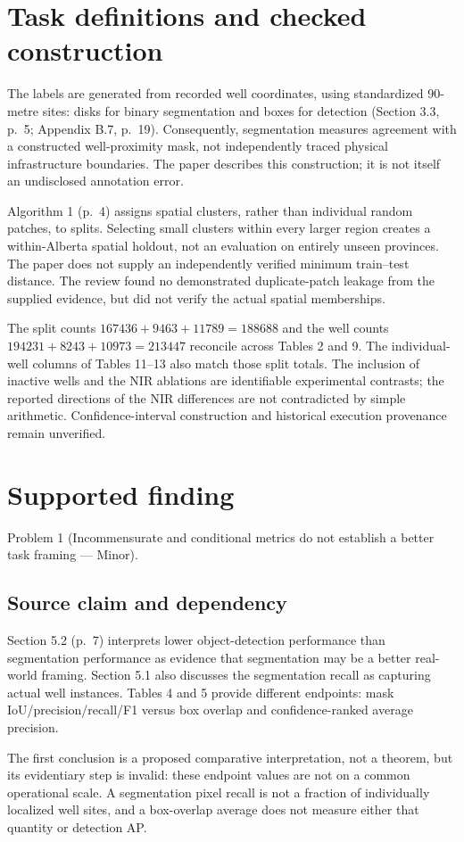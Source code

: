 \documentclass[10pt]{article}
\begin{document}
\section*{Task definitions and checked construction}
The labels are generated from recorded well coordinates, using standardized 90-metre sites: disks for binary segmentation and boxes for detection (Section 3.3, p. 5; Appendix B.7, p. 19). Consequently, segmentation measures agreement with a constructed well-proximity mask, not independently traced physical infrastructure boundaries. The paper describes this construction; it is not itself an undisclosed annotation error.\par
Algorithm 1 (p. 4) assigns spatial clusters, rather than individual random patches, to splits. Selecting small clusters within every larger region creates a within-Alberta spatial holdout, not an evaluation on entirely unseen provinces. The paper does not supply an independently verified minimum train–test distance. The review found no demonstrated duplicate-patch leakage from the supplied evidence, but did not verify the actual spatial memberships.\par
The split counts \(167436+9463+11789=188688\) and the well counts \(194231+8243+10973=213447\) reconcile across Tables 2 and 9. The individual-well columns of Tables 11–13 also match those split totals. The inclusion of inactive wells and the NIR ablations are identifiable experimental contrasts; the reported directions of the NIR differences are not contradicted by simple arithmetic. Confidence-interval construction and historical execution provenance remain unverified.\par
\section*{Supported finding}
Problem 1 (Incommensurate and conditional metrics do not establish a better task framing — Minor).\par
\subsection*{Source claim and dependency}
Section 5.2 (p. 7) interprets lower object-detection performance than segmentation performance as evidence that segmentation may be a better real-world framing. Section 5.1 also discusses the segmentation recall as capturing actual well instances. Tables 4 and 5 provide different endpoints: mask IoU/precision/recall/F1 versus box overlap and confidence-ranked average precision.\par
The first conclusion is a proposed comparative interpretation, not a theorem, but its evidentiary step is invalid: these endpoint values are not on a common operational scale. A segmentation pixel recall is not a fraction of individually localized well sites, and a box-overlap average does not measure either that quantity or detection AP.\par
\end{document}
